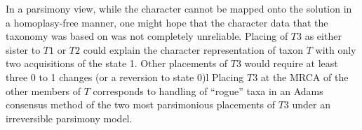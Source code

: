 \documentclass[english]{article}
\begin{document}
In a parsimony view, while the character cannot be mapped onto the solution in
    a homoplasy-free manner, one might hope that the character data that the
    taxonomy was based on was not completely unreliable.
Placing of $T3$ as either sister to $T1$ or $T2$ could explain the character
    representation of taxon $T$ with only two acquisitions of the state 1.
Other placements of $T3$ would require at least three 0 to 1 changes (or a reversion
    to state 0)l
Placing $T3$ at the MRCA 
    of the other members of $T$ corresponds
    to handling of ``rogue'' taxa in an Adams consensus method of the two
    most parsimonious placements of $T3$ under an irreversible parsimony model.



\end{document}

